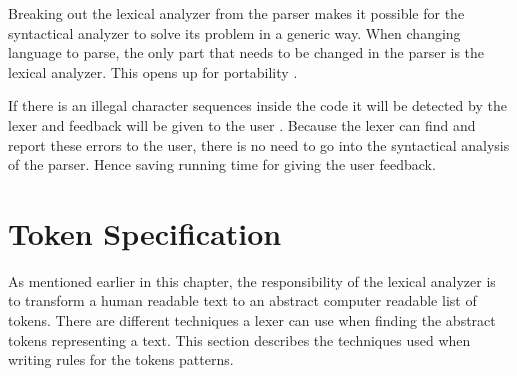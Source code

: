 Breaking out the lexical analyzer from the parser makes it possible for the
syntactical analyzer to solve its problem in a generic way. When changing language
to parse, the only part that needs to be changed in the parser is the lexical
analyzer. This opens up for portability \cite{Aho2006}\cite{sebesta2012}.

If there is an illegal character sequences inside the code it will be detected
by the lexer and feedback will be given to the user \cite{sebesta2012}. Because
the lexer can find and report these errors to the user, there is no need to go
into the syntactical analysis of the parser. Hence saving running time for
giving the user feedback.

\section{Token Specification}
As mentioned earlier in this chapter, the responsibility of the lexical analyzer
is to transform a human readable text to an abstract computer readable list of
tokens. There are different techniques a lexer can use when finding the
abstract tokens representing a text. This section describes the techniques used
when writing rules for the tokens patterns.


